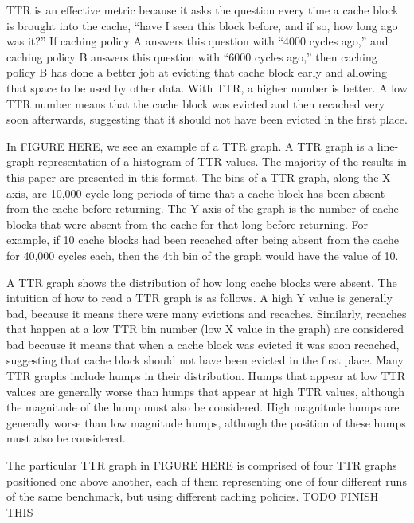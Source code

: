 TTR is an effective metric because it asks the question every time a
cache block is brought into the cache, ``have I seen this block
before, and if so, how long ago was it?''  If caching policy A answers
this question with ``4000 cycles ago,'' and caching policy B answers
this question with ``6000 cycles ago,'' then caching policy B has done
a better job at evicting that cache block early and allowing that
space to be used by other data.  With TTR, a higher number is better.
A low TTR number means that the cache block was evicted and then
recached very soon afterwards, suggesting that it should not have
been evicted in the first place.

In FIGURE HERE, we see an example of a TTR graph.  A TTR graph is a
line-graph representation of a histogram of TTR values.  The majority
of
the results in this paper are presented in this format.  The bins of a
TTR graph, along the X-axis,  are 10,000 cycle-long periods of time
that a cache block has
been absent from the cache before returning.  The Y-axis of the graph
is the number of cache blocks that were absent from the cache for that
long before returning.  For example, if 10 cache blocks had been
recached after being absent from the cache for 40,000 cycles each,
then the 4th bin of the graph would have the value of 10.

A TTR graph shows the distribution of how long cache blocks were
absent.  The intuition of how to read a TTR graph is as follows.  A
high Y value is generally bad, because it means there were many
evictions
and recaches.  Similarly, recaches that happen at a low TTR bin number
(low X value in the graph) are considered bad because it means that
when a cache block was evicted it was soon recached, suggesting that
cache block should not have been evicted in the first place.  Many TTR
graphs include humps in their distribution.  Humps that appear at low
TTR values are generally worse than humps that appear at high TTR
values, although the magnitude of the hump must also be considered.
High magnitude humps are generally worse than low magnitude humps,
although the position of these humps must also be considered.

The particular TTR graph in FIGURE HERE is comprised of four TTR
graphs positioned one above another, each of them representing one of
four different runs of the same benchmark, but using different caching
policies.  TODO FINISH THIS
